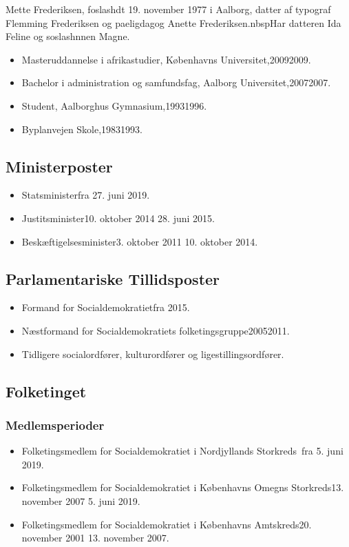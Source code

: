 \documentclass[11pt, a4paper]{awesome-cv}
\begin{document}
\makecvheader[R]
\makelettertitle
\begin{cvletter}
Mette Frederiksen, foslashdt 19. november 1977 i Aalborg, datter af typograf Flemming Frederiksen og paeligdagog Anette Frederiksen.nbspHar datteren Ida Feline og soslashnnen Magne.

\begin{itemize}
\item Masteruddannelse i afrikastudier, Københavns Universitet,20092009.
\item Bachelor i administration og samfundsfag, Aalborg Universitet,20072007.
\item Student, Aalborghus Gymnasium,19931996.
\item Byplanvejen Skole,19831993.
\end{itemize}
\subsection*{Ministerposter}
\begin{itemize}
\item Statsministerfra 27. juni 2019.
\item Justitsminister10. oktober 2014  28. juni 2015.
\item Beskæftigelsesminister3. oktober 2011  10. oktober 2014.
\end{itemize}
\subsection*{Parlamentariske Tillidsposter}
\begin{itemize}
\item Formand for Socialdemokratietfra 2015.
\item Næstformand for Socialdemokratiets folketingsgruppe20052011.
\item Tidligere socialordfører, kulturordfører og ligestillingsordfører.
\end{itemize}
\subsection*{Folketinget}
\subsubsection*{Medlemsperioder}
\begin{itemize}
\item Folketingsmedlem for Socialdemokratiet i Nordjyllands Storkreds fra 5. juni 2019.
\item Folketingsmedlem for Socialdemokratiet i Københavns Omegns Storkreds13. november 2007  5. juni 2019.
\item Folketingsmedlem for Socialdemokratiet i Københavns Amtskreds20. november 2001  13. november 2007.
\end{itemize}

\end{cvletter}
\end{document}
